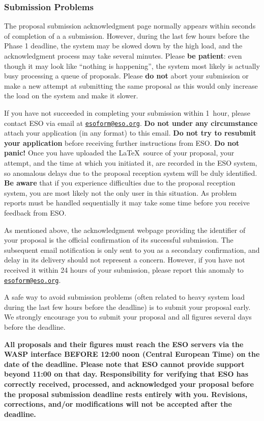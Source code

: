 \documentclass{article}
\begin{document}
\subsubsection*{Submission Problems} 
The proposal submission
acknowledgment page normally appears within seconds of completion of a
a submission. However, during the last few hours before the Phase 1
deadline, the system may be slowed down by the high load, and the
acknowledgment process may take several minutes. Please {\bf be
patient}: even though it may look like ``nothing is happening'', the
system most likely is actually busy processing a queue of
proposals. Please {\bf do not} abort your submission or make a new
attempt at submitting the same proposal as this would only increase the
load on the system and make it slower. 

If you have not succeeded in completing your submission within 1~hour, 
please contact ESO via email  
at \href{mailto:esoform@eso.org}{\tt esoform@eso.org}.
{\bf Do not under any circumstance} attach your application (in any
format) to this email. {\bf Do not try to resubmit your application}
before receiving further instructions from ESO. {\bf Do not panic!}
Once you have uploaded the \LaTeX\ source of your proposal, your
attempt, and the time at which you initiated it, are recorded in the
ESO system, so anomalous delays due to the proposal reception
system will be duly identified. {\bf Be aware} that if you experience
difficulties due to the proposal reception system, you are most likely 
not the only user in this situation. As problem reports must be
handled sequentially it may take some time before you receive
feedback from ESO.  

As mentioned above, the acknowledgment webpage providing the
identifier of your proposal is the official confirmation of its
successful submission. The subsequent email notification is only sent
to you as a secondary confirmation, and delay in its delivery should
not represent a concern. However, if you have not received
it within 24 hours of your submission, please report this anomaly to  
\href{mailto:esoform@eso.org}{\tt esoform@eso.org}. 

A safe way to avoid submission problems (often related to heavy
system load  during the last few hours before the deadline) is to submit your
proposal early.  We strongly encourage you to submit your
proposal and all figures several days before the deadline.
  
\vspace*{1cm} {\bf All proposals and their figures must reach the
  ESO servers via the WASP interface BEFORE 12:00 noon (Central
  European Time) on the date of the deadline. Please note that  
  ESO cannot provide support beyond 11:00 on that day. 
  Responsibility for 
  verifying that ESO has correctly received, processed, and
  acknowledged your proposal before the proposal submission deadline
  rests entirely with you.  Revisions, corrections, and/or
  modifications will not be accepted after the deadline.}
\end{document}
